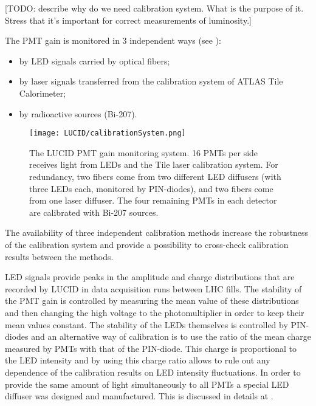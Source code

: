 
[TODO: describe why do we need calibration system. What is the purpose of it. Stress that it's important for correct measurements of luminosity.]

The PMT gain is monitored in 3 independent ways (see ):
\begin{itemize}
 \item by LED signals carried by optical fibers;
 \item by laser signals transferred from the calibration system of ATLAS Tile Calorimeter;
 \item by radioactive sources (Bi-207).
\end{itemize}

\begin{figure}
\centering
\texttt{[image: LUCID/calibrationSystem.png]}
\caption{The LUCID PMT gain monitoring system. 16 PMTs per side receives light from LEDs and the Tile laser calibration 
system. 
For redundancy, two fibers come from two different LED diffusers (with three LEDs each, monitored by 
PIN-diodes), and two fibers come from one laser diffuser. The four remaining PMTs in each detector are calibrated 
with Bi-207 sources.}
\label{fig:calibrationSystem}
\end{figure}

The availability of three independent calibration methods increase the robustness of the calibration system 
and provide a possibility to cross-check calibration results between the methods.

LED signals provide peaks in the amplitude and charge distributions that are recorded by LUCID in data acquisition runs between LHC fills.
The stability of the PMT gain is controlled by measuring the mean value of these distributions 
and then changing the high voltage to the photomultiplier in order to keep their mean values constant. 
The stability of the LEDs themselves is controlled by PIN-diodes and an alternative way of calibration is 
to use the ratio of the mean charge measured by PMTs with that of the PIN-diode. 
This charge is proportional to the LED intensity and by using this charge ratio allows to rule out any 
dependence of the calibration results on LED intensity fluctuations.
In order to provide the same amount of light simultaneously to all PMTs a special LED diffuser was designed and manufactured.
This is discussed in details at .

